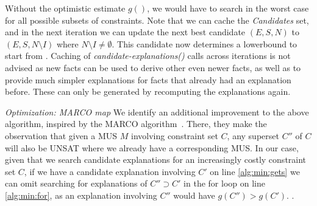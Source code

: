 Without the optimistic estimate $g()$, we would have to search in the worst case for all possible subsets of constraints. Note that we can cache the \textit{Candidates} set, and in the next iteration we can update the next best candidate $(E, S, N)$ to $(E, S, N \setminus I)$ where $N \setminus I \neq \emptyset$. This candidate now determines a lowerbound to start from .
Caching of \textit{candidate-explanations()} calls across iterations is not advised as new facts can be used to derive other even newer facts, as well as to provide much simpler explanations for facts that already had an explanation before. These can only be generated by recomputing the explanations again. %

\textit{Optimization: MARCO map} We identify an additional improvement to the above algorithm, inspired by the MARCO algorithm~\cite{liffiton2013enumerating}. There, they make the observation that given a MUS $M$ involving constraint set $C$, any superset $C''$ of $C$ will also be UNSAT where we already have a corresponding MUS. In our case, given that we search candidate explanations for an increasingly costly constraint set $C$, if we have a candidate explanation involving $C'$ on line \ref{alg:min:gets} we can omit searching for explanations of $C'' \supset C'$ in the for loop on line \ref{alg:min:for}, as an explanation involving $C''$ would have $g(C'') > g(C')$. .




